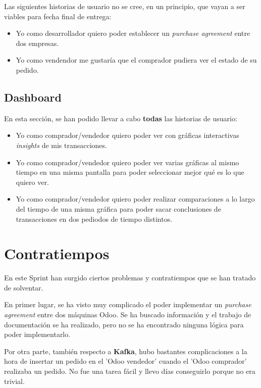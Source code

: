 \documentclass[12pt, a4paper, twoside]{article} %
\newcommand{\B}[1]{\textbf{#1}}
\newcommand{\ti}{\emph} %
\begin{document}
Las siguientes historias de usuario no se cree, en un principio, que vayan a ser viables para fecha final de entrega:

\begin{itemize}[label=\textcolor{redos}{\textbullet}]

    \item Yo como desarrollador quiero poder establecer un \ti{purchase agreement} entre dos empresas.
    \item Yo como vendendor me gustaría que el comprador pudiera ver el estado de su pedido.
\end{itemize}

\subsection*{Dashboard}
En esta sección, se han podido llevar a cabo \B{\textcolor{verdeos}{todas}} las historias de usuario:

\begin{itemize}[label=\textcolor{verdeos}{\textbullet}]
    \item Yo como comprador/vendedor quiero poder ver con gráficas interactivas \ti{insights} de mis transacciones.
    \item Yo como comprador/vendedor quiero poder ver varias gráficas al mismo tiempo en una misma pantalla para poder seleccionar mejor qué es lo que quiero ver.
    \item Yo como comprador/vendedor quiero poder realizar comparaciones a lo largo del tiempo de una misma gráfica para poder sacar conclusiones de transacciones en dos pediodos de tiempo distintos.
\end{itemize}

\section*{Contratiempos}

En este Sprint han surgido ciertos problemas y contratiempos que se han tratado de solventar.

En primer lugar, se ha visto muy complicado el poder implementar un \ti{purchase agreement} entre dos máquinas Odoo. Se ha buscado información y el trabajo de documentación se ha realizado, pero no se ha encontrado ninguna lógica para poder implementarlo. 

Por otra parte, también respecto a \B{Kafka}, hubo bastantes complicaciones a la hora de insertar un pedido en el 'Odoo vendedor' cuando el 'Odoo comprador' realizaba un pedido. No fue una tarea fácil y llevo días conseguirlo porque no era trivial.
\end{document}
